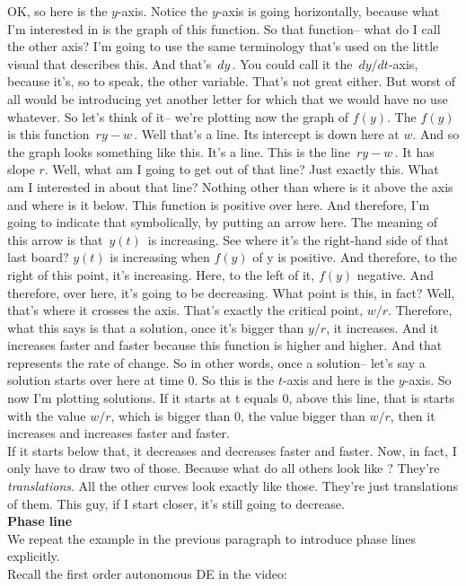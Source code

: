 OK, so here is the $y$-axis.
Notice the $y$-axis is going horizontally,
because what I'm interested in is the graph of this function.
So that function-- what do I call the other axis?
I'm going to use the same terminology that's
used on the little visual that describes this.
And that's $\, dy \,$.
You could call it the $\, dy/dt$-axis, because it's, so
to speak, the other variable.
That's not great either.
But worst of all would be introducing yet another letter for which that we
would have no use whatever.
So let's think of it--
we're plotting now the graph of $f(y)$.
The $f(y)$ is this function $\, ry - w \,$.
Well that's a line.
Its intercept is down here at $w$.
And so the graph looks something like this.
It's a line. This is the line $\, ry - w\,$. It has slope $r$.
Well, what am I going to get out of that line?
Just exactly this.
What am I interested in about that line?
Nothing other than where is it above the axis
and where is it below.
This function is positive over here.
And therefore, I'm going to indicate that symbolically,
by putting an arrow here.
The meaning of this arrow is that $\,y (t) \,$ is increasing.
See where it's the right-hand side of that last board?
$y(t)$ is increasing when $f(y)$ of y is positive. 
And therefore, to the right of this point, it's increasing.
Here, to the left of it, $f(y)$ negative.
And therefore, over here, it's going to be decreasing.
What point is this, in fact?
Well, that's where it crosses the axis.
That's exactly the critical point, $w/r$.
Therefore, what this says is that a solution,
once it's bigger than $y/r$, it increases.
And it increases faster and faster because this function is higher and higher.
And that represents the rate of change.
So in other words, once a solution--
let's say a solution starts over here at time $0$.
So this is the $t$-axis and here is the $y$-axis.
So now I'm plotting solutions.
If it starts at t equals $0$, above this line, that
is starts with the value $w/r$, which is bigger than $0$,
the value bigger than $w/r$, then it increases and increases
faster and faster.\\
If it starts below that, it decreases and decreases
faster and faster.
Now, in fact, I only have to draw two of those.
Because what do all others look like ?
They're \emph{translations}.
All the other curves look exactly like those.
They're just translations of them.
This guy, if I start closer, it's still going to decrease. \\

\textbf{Phase line} \\
We repeat the example in the previous paragraph to introduce phase lines explicitly.\\
Recall the first order autonomous DE in the video:

